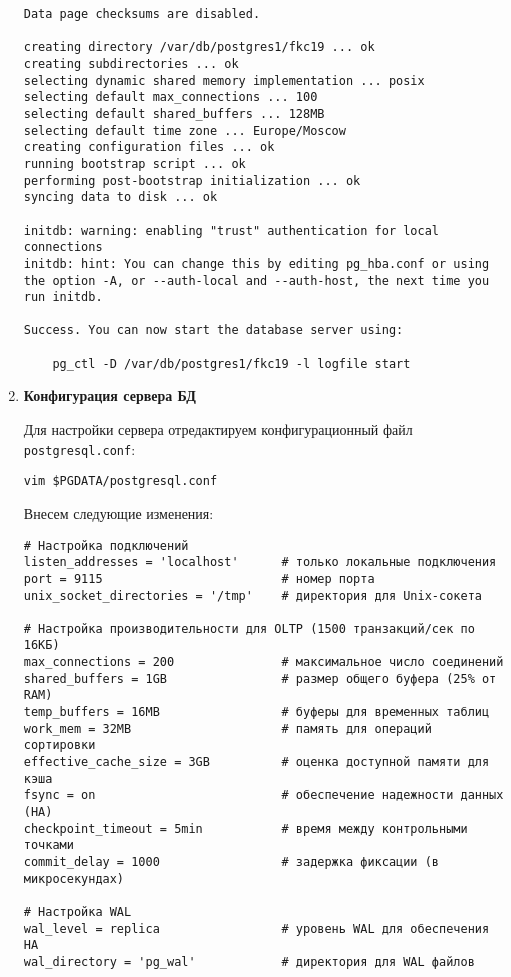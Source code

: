 \begin{enumerate}
\begin{verbatim}
Data page checksums are disabled.

creating directory /var/db/postgres1/fkc19 ... ok
creating subdirectories ... ok
selecting dynamic shared memory implementation ... posix
selecting default max_connections ... 100
selecting default shared_buffers ... 128MB
selecting default time zone ... Europe/Moscow
creating configuration files ... ok
running bootstrap script ... ok
performing post-bootstrap initialization ... ok
syncing data to disk ... ok

initdb: warning: enabling "trust" authentication for local connections
initdb: hint: You can change this by editing pg_hba.conf or using the option -A, or --auth-local and --auth-host, the next time you run initdb.

Success. You can now start the database server using:

    pg_ctl -D /var/db/postgres1/fkc19 -l logfile start

\end{verbatim}

\item \textbf{Конфигурация сервера БД}

Для настройки сервера отредактируем конфигурационный файл \texttt{postgresql.conf}:

\begin{verbatim}
vim $PGDATA/postgresql.conf
\end{verbatim}

Внесем следующие изменения:

\begin{verbatim}
# Настройка подключений
listen_addresses = 'localhost'      # только локальные подключения
port = 9115                         # номер порта
unix_socket_directories = '/tmp'    # директория для Unix-сокета

# Настройка производительности для OLTP (1500 транзакций/сек по 16КБ)
max_connections = 200               # максимальное число соединений
shared_buffers = 1GB                # размер общего буфера (25% от RAM)
temp_buffers = 16MB                 # буферы для временных таблиц
work_mem = 32MB                     # память для операций сортировки
effective_cache_size = 3GB          # оценка доступной памяти для кэша
fsync = on                          # обеспечение надежности данных (HA)
checkpoint_timeout = 5min           # время между контрольными точками
commit_delay = 1000                 # задержка фиксации (в микросекундах)

# Настройка WAL
wal_level = replica                 # уровень WAL для обеспечения HA
wal_directory = 'pg_wal'            # директория для WAL файлов


\end{verbatim}
\end{enumerate}
